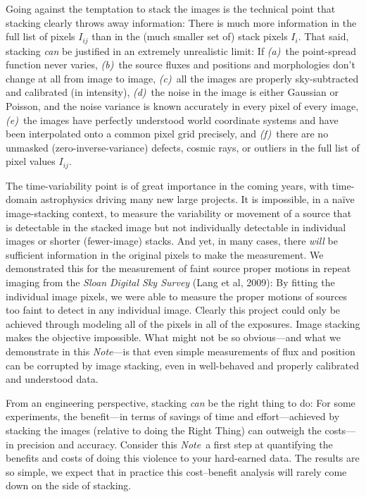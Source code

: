 \documentclass[12pt,preprint]{aastex}
\newcommand{\project}[1]{\textsl{#1}}
\newcommand{\documentname}{\textsl{Note}}
\begin{document}
Going against the temptation to stack the images is the technical
point that stacking clearly throws away information: There is much
more information in the full list of pixels $I_{ij}$ than in the (much
smaller set of) stack pixels $I_i$.  That said, stacking \emph{can} be
justified in an extremely unrealistic limit: If \textsl{(a)}~the
point-spread function never varies, \textsl{(b)}~the source fluxes and
positions and morphologies don't change at all from image to image,
\textsl{(c)}~all the images are properly sky-subtracted and calibrated
(in intensity), \textsl{(d)}~the noise in the image is either Gaussian
or Poisson, and the noise variance is known accurately in every pixel
of every image, \textsl{(e)}~the images have perfectly understood
world coordinate systems and have been interpolated onto a common
pixel grid precisely, and \textsl{(f)}~there are no unmasked
(zero-inverse-variance) defects, cosmic rays, or outliers in the full
list of pixel values $I_{ij}$.

The time-variability point is of great importance in the coming years,
with time-domain astrophysics driving many new large projects.  It is
impossible, in a na\"ive image-stacking context, to measure the
variability or movement of a source that is detectable in the stacked
image but not individually detectable in individual images or shorter
(fewer-image) stacks.  And yet, in many cases, there \emph{will} be
sufficient information in the original pixels to make the measurement.
We demonstrated this for the measurement of faint source proper
motions in repeat imaging from the \project{Sloan Digital Sky Survey}
(Lang et al, 2009): By fitting the individual image pixels, we were
able to measure the proper motions of sources too faint to detect in
any individual image.  Clearly this project could only be achieved
through modeling all of the pixels in all of the exposures.  Image
stacking makes the objective impossible.  What might not be so
obvious---and what we demonstrate in this \documentname---is that even
simple measurements of flux and position can be corrupted by image
stacking, even in well-behaved and properly calibrated and understood
data.

From an engineering perspective, stacking \emph{can} be the right
thing to do: For some experiments, the benefit---in terms of savings
of time and effort---achieved by stacking the images (relative to
doing the Right Thing) can outweigh the costs---in precision and
accuracy.  Consider this \documentname\ a first step at quantifying
the benefits and costs of doing this violence to your hard-earned
data.  The results are so simple, we expect that in practice this
cost--benefit analysis will rarely come down on the side of stacking.
\end{document}
